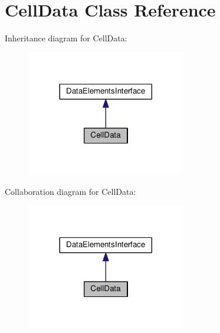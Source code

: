 \hypertarget{class_cell_data}{}\section{Cell\+Data Class Reference}
\label{class_cell_data}


Inheritance diagram for Cell\+Data\+:
\nopagebreak
\begin{figure}[H]
\begin{center}
\leavevmode
\includegraphics[width=197pt]{class_cell_data__inherit__graph}
\end{center}
\end{figure}


Collaboration diagram for Cell\+Data\+:
\nopagebreak
\begin{figure}[H]
\begin{center}
\leavevmode
\includegraphics[width=197pt]{class_cell_data__coll__graph}
\end{center}
\end{figure}
